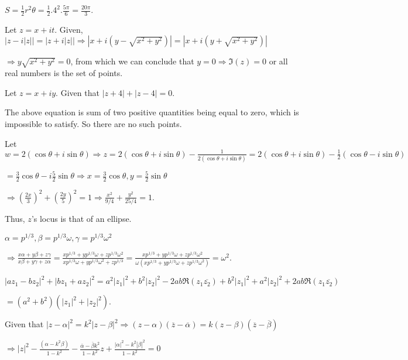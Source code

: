     $S = \frac{1}{2}r^2\theta = \frac{1}{2}.4^2.\frac{5\pi}{6} = \frac{20\pi}{3}$.
  \stopitemize
\item Let $z = x + it$. Given, $|z - i|z|| = |z + i|z|| \Rightarrow |x + i(y - \sqrt{x^2 + y^2})| = |x +
  i(y + \sqrt{x^2 + y^2})|$

  $\Rightarrow y\sqrt{x^2 + y^2} = 0$, from which we can conclude that $y = 0 \Rightarrow \Im(z) = 0$ or
  all real numbers is the set of points.
\item Let $z = x + iy$. Given that $|z + 4| + |z - 4| = 0$.

  The above equation is sum of two positive quantities being equal to zero, which is impossible to
  satisfy. So there are no such points.
\item Let $w = 2(\cos\theta + i\sin\theta)\Rightarrow z = 2(\cos\theta + i\sin\theta) -
  \frac{1}{2(\cos\theta + i\sin\theta)} = 2(\cos\theta + i\sin\theta) - \frac{1}{2}(\cos\theta -
  i\sin\theta)$

  $= \frac{3}{2}\cos\theta - i\frac{5}{2}\sin\theta\Rightarrow x = \frac{3}{2}\cos\theta, y =
  \frac{5}{2}\sin\theta$

  $\Rightarrow \left(\frac{2x}{3}\right)^2 + \left(\frac{2y}{5}\right)^2 = 1 \Rightarrow \frac{x^2}{9/4} +
  \frac{y^2}{25/4} = 1$.

  Thus, $z$'s locus is that of an ellipse.
\item $\alpha = p^{1/3}, \beta = p^{1/3}\omega, \gamma = p^{1/3}\omega^2$

  $\Rightarrow \frac{x\alpha + y\beta + z\gamma}{x\beta + y\gamma + z\alpha} = \frac{xp^{1/3} +
  yp^{1/3}\omega + zp^{1/3}\omega^2}{xp^{1/3}\omega + yp^{1/3}\omega^2 + zp^{1/3}}
  = \frac{xp^{1/3} + yp^{1/3}\omega + zp^{1/3}\omega^2}{\omega(xp^{1/3} + yp^{1/3}\omega +
    zp^{1/3}\omega^2)} = \omega^2$.
\item $|az_1 - bz_2|^2 + |bz_1 + az_2|^2 = a^2|z_1|^2 + b^2|z_2|^2 - 2ab\Re(z_1\overline{z_2}) + b^2|z_1|^2
  + a^2|z_2|^2 + 2ab\Re(z_1\overline{z_2})$

  $= (a^2 + b^2)(|z_1|^2 + |z_2|^2)$.
\item Given that $|z - \alpha|^2 = k^2|z - \beta|^2 \Rightarrow (z - \alpha)(\overline{z} -
  \overline{\alpha}) = k(z - \beta)(\overline{z} - \overline{\beta})$

  $\Rightarrow |z|^2 - \frac{(\alpha - k^2\beta)}{1 - k^2} - \frac{\overline{\alpha} -
    \overline{\beta}k^2}{1 - k^2}z + \frac{|\alpha|^2 - k^2|\beta|^2}{1 - k^2} = 0$

